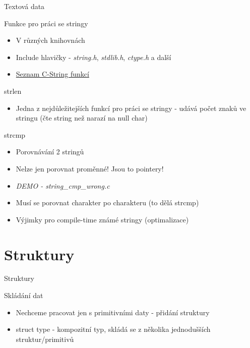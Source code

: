 \documentclass[9pt]{beamer}
\begin{document}
\begin{frame}{Textová data}
    \begin{block}{Funkce pro práci se stringy}
        \begin{itemize}
            \item V různých knihovnách
            \item Include hlavičky - 
            \textit{string.h},
            \textit{stdlib.h},
            \textit{ctype.h} a další
            \item \href{https://en.cppreference.com/w/c/string/byte}{Seznam C-String funkcí}
        \end{itemize}
    \end{block}
    \begin{block}{strlen}
        \begin{itemize}
            \item Jedna z nejdůležitejších funkcí pro práci se stringy - udává
            počet znaků ve stringu (čte string než narazí na null char)
        \end{itemize}
    \end{block}
    \begin{block}{strcmp}
        \begin{itemize}
            \item Porovnávání 2 stringů
            \item Nelze jen porovnat proměnné! Jsou to pointery!
            \item \textit{DEMO - string\_cmp\_wrong.c}
            \item Musí se porovnat charakter po charakteru (to dělá strcmp)
            \item Výjimky pro compile-time známé stringy (optimalizace)
        \end{itemize}
    \end{block}
\end{frame}

\section{Struktury}

\begin{frame}{Struktury}
    \begin{block}{Skládání dat}
        \begin{itemize}
            \item Nechceme pracovat jen s primitivními daty - přidání struktury
            \item struct type - kompozitní typ, skládá se z několika jednodušších struktur/primitivů
        \end{itemize}
    \end{block}
    
\end{frame}
\end{document}
